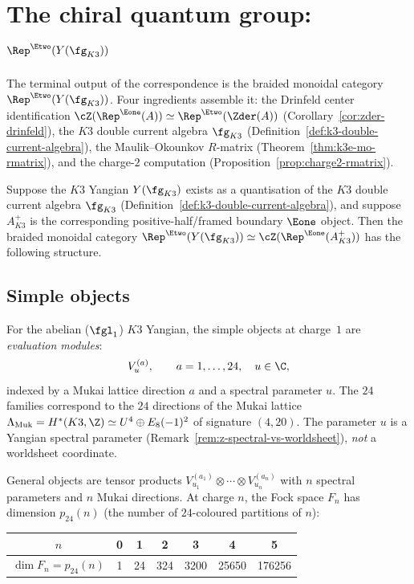 \section{The chiral quantum group: \texorpdfstring{$\Rep^{\Etwo}(Y(\fg_{K3}))$}{Rep-E2(Y(g-K3))}}
\label{sec:chiral-qg-rep-category}

The terminal output of the correspondence is the braided monoidal
category $\Rep^{\Etwo}(Y(\fg_{K3}))$. Four ingredients assemble it:
the Drinfeld center identification $\cZ(\Rep^{\Eone}(A)) \simeq
\Rep^{\Etwo}(\Zder(A))$ (Corollary~\ref{cor:zder-drinfeld}),
the $K3$ double current algebra $\fg_{K3}$
(Definition~\ref{def:k3-double-current-algebra}),
the Maulik--Okounkov $R$-matrix
(Theorem~\ref{thm:k3e-mo-rmatrix}),
and the charge-$2$ computation
(Proposition~\ref{prop:charge2-rmatrix}).

\begin{conjecture}
\label{conj:chiral-qg-k3}
\ClaimStatusConjectured
Suppose the $K3$ Yangian $Y(\fg_{K3})$ exists as a quantisation of
the $K3$ double current algebra $\fg_{K3}$
(Definition~\ref{def:k3-double-current-algebra}), and suppose
$A^+_{K3}$ is the corresponding positive-half/framed boundary
$\Eone$ object.
Then the braided monoidal category
$\Rep^{\Etwo}(Y(\fg_{K3})) \simeq \cZ(\Rep^{\Eone}(A^+_{K3}))$
has the following structure.
\end{conjecture}

\subsection{Simple objects}
\label{subsec:chiral-qg-simples}

For the abelian ($\fgl_1$) $K3$ Yangian, the simple objects at
charge~$1$ are \emph{evaluation modules}:
\[
 V_u^{(a)}, \qquad a = 1, \dots, 24, \quad u \in \C,
\]
indexed by a Mukai lattice direction $a$ and a spectral parameter $u$.
The $24$ families correspond to the $24$ directions of the Mukai lattice
$\Lambda_{\mathrm{Muk}} = H^*(K3, \Z) \simeq U^4 \oplus E_8(-1)^2$
of signature $(4, 20)$. The parameter $u$ is a Yangian spectral
parameter (Remark~\ref{rem:z-spectral-vs-worldsheet}), \emph{not}
a worldsheet coordinate.

General objects are tensor products
$V_{u_1}^{(a_1)} \otimes \cdots \otimes V_{u_n}^{(a_n)}$
with $n$ spectral parameters and $n$ Mukai directions.
At charge $n$, the Fock space $F_n$ has dimension $p_{24}(n)$
(the number of $24$-coloured partitions of $n$):
\begin{center}
\begin{tabular}{c|cccccc}
\toprule
$n$ & 0 & 1 & 2 & 3 & 4 & 5 \\
\midrule
$\dim F_n = p_{24}(n)$ & 1 & 24 & 324 & 3200 & 25650 & 176256 \\
\bottomrule
\end{tabular}
\end{center}

